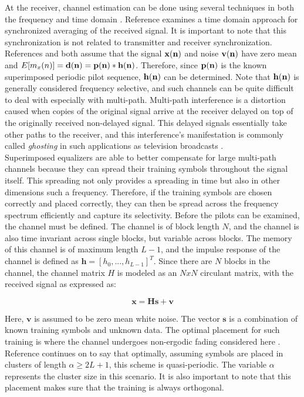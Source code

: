 At the receiver, channel estimation can be done using several techniques in both the frequency and time domain \cite{TBD}.  Reference \cite{17} examines a time domain approach for synchronized averaging of the received signal.  It is important to note that this synchronization is not related to transmitter and receiver synchronization.  References \cite{17} and \cite{18} both assume that the signal \( \bf{x}(n)\) and noise \( \bf{v}(n) \) have zero mean and \(E[m_{x}(n)] = \bf{d}(n) = \bf{p}(n) \ast \bf{h}(n)\).  Therefore, since \(\bf{p}(n) \) is the known superimposed periodic pilot sequence, \(\bf{h}(n)\) can be determined.  Note that \(\bf{h}(n)\) is generally considered frequency selective, and such channels can be quite difficult to deal with especially with multi-path.  Multi-path interference is a distortion caused when copies of the original signal arrive at the receiver delayed on top of the originally received non-delayed signal.  This delayed signals essentially take other paths to the receiver, and this interference's manifestation is commonly called \textit{ghosting} in such applications as television broadcasts \cite{ghost}.\\

Superimposed equalizers are able to better compensate for large multi-path channels because they can spread their training symbols throughout the signal itself.  This spreading not only provides a spreading in time but also in other dimensions such a frequency.  Therefore, if the training symbols are chosen correctly and placed correctly, they can then be spread across the frequency spectrum efficiently and capture its selectivity.  Before the pilots can be examined, the channel must be defined.  The channel is of block length \(N\), and the channel is also time invariant across single blocks, but variable across blocks.  The memory of this channel is of maximum length \(L-1\), and the impulse response of the channel is defined as \(\textbf{h}=[h_{0},...,h_{L-1}]^{T}\).  Since there are \(N\) blocks in the channel, the channel matrix \(H\) is modeled as an \(N x N\) circulant matrix, with the received signal as expressed as:

\begin{equation}
\textbf{x}=\textbf{H}\textbf{s}+\textbf{v}
\end{equation}

Here, \(\textbf{v}\) is assumed to be zero mean white noise.  The vector \(\textbf{s}\) is a combination of known training symbols and unknown data.  The optimal placement for such training is where the channel undergoes non-ergodic fading considered here \cite{20}.  Reference \cite{16} continues on to say that optimally, assuming symbols are placed in clusters of length \(\alpha \ge 2L+1\), this scheme is quasi-periodic.  The variable \(\alpha\) represents the cluster size in this scenario.  It is also important to note that this placement makes sure that the training is always orthogonal.\\

